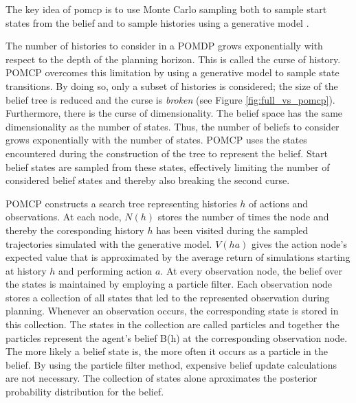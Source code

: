 The key idea of \Gls{pomcp} is to use Monte Carlo sampling both to sample start states from the belief and to sample histories using a generative model \parencite{pomcp}. 

The number of histories to consider in a POMDP grows exponentially with respect to the depth of the planning horizon. This is called the curse of history. POMCP overcomes this limitation by using a generative model to sample state transitions. By doing so, only a subset of histories is considered; the size of the belief tree is reduced and the curse is \textit{broken} (see Figure \ref{fig:full_vs_pomcp}). Furthermore, there is the curse of dimensionality. The belief space has the same dimensionality as the number of states. Thus, the number of beliefs to consider grows exponentially with the number of states. POMCP uses the states encountered during the construction of the tree to represent the belief. Start belief states are sampled from these states, effectively limiting the number of considered belief states and thereby also breaking the second curse. 



POMCP constructs a search tree representing histories $h$ of actions and observations. At each node, $N(h)$ stores the number of times the node and thereby the coresponding history $h$ has been visited during the sampled trajectories simulated with the generative model. $V(ha)$ gives the action node's expected value that is approximated by the average return of simulations starting at history $h$ and performing action $a$. At every observation node, the belief over the states is maintained by employing a particle filter. Each observation node stores a collection of all states that led to the represented observation during planning. Whenever an observation occurs, the corresponding state is stored in this collection. The states in the collection are called particles and together the particles represent the agent's belief B(h) at the corresponding observation node. The more likely a belief state is, the more often it occurs as a particle in the belief. By using the particle filter method, expensive belief update calculations are not necessary. The collection of states alone aproximates the posterior probability distribution for the belief.

